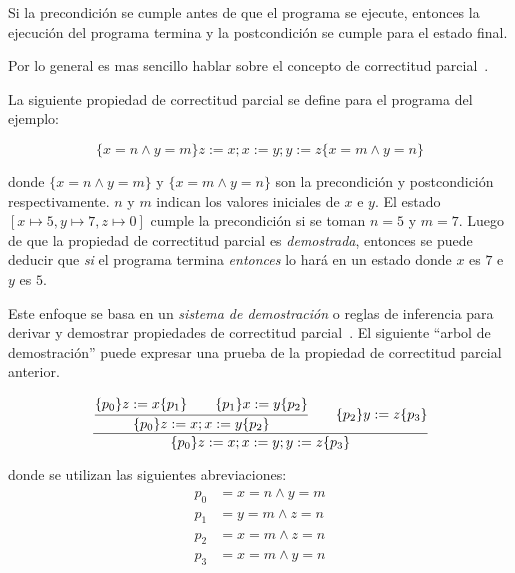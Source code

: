 \begin{displayquote}
Si la precondición se cumple antes de que el programa se ejecute, entonces la ejecución del programa termina y la postcondición se cumple para el estado final.
\end{displayquote}

Por lo general es mas sencillo hablar sobre el concepto de correctitud parcial~\citep{nipkow}.


La siguiente propiedad de correctitud parcial se define para el programa del ejemplo:

\begin{equation*}
\lbrace x=n \land y=m \rbrace z:=x; x:=y; y:=z \lbrace x=m \land y=n \rbrace
\end{equation*}

donde $\lbrace x=n \land y=m \rbrace $ y $\lbrace x=m \land y=n \rbrace $ son la precondición y postcondición respectivamente.
$n$ y $m$ indican los valores iniciales de $x$ e $y$.
El estado $[x\mapsto5, y\mapsto7, z\mapsto0]$ cumple la precondición si se toman $n=5$ y $m=7$.
Luego de que la propiedad de correctitud parcial es \textit{demostrada}, entonces se puede deducir que \textit{si} el programa termina \textit{entonces} lo hará en un estado donde $x$ es $7$ e $y$ es $5$.

Este enfoque se basa en un \textit{sistema de demostración} o reglas de inferencia para derivar y demostrar propiedades de correctitud parcial~\citep{nipkow}.
El siguiente ``arbol de demostración'' puede expresar una prueba de la propiedad de correctitud parcial anterior.
\begin{comment}
FIXME demostrar o probar
\end{comment}

\begin{equation*}
\cfrac{
  \cfrac{ \lbrace p_{0} \rbrace z:=x \lbrace p_{1} \rbrace \qquad \lbrace p_{1} \rbrace x:=y \lbrace p_{2} \rbrace }
    { \lbrace p_{0} \rbrace z:=x; x:=y \lbrace p_{2} \rbrace }
  \qquad
 \lbrace p_{2} \rbrace y:=z \lbrace p_{3} \rbrace
  }
  { \lbrace p_{0} \rbrace z:=x; x:=y; y:=z \lbrace p_{3} \rbrace }
\end{equation*}

donde se utilizan las siguientes abreviaciones:
\begin{align*}
p_{0} &= x=n \land y=m\\
p_{1} &= y=m \land z=n\\
p_{2} &= x=m \land z=n\\
p_{3} &= x=m \land y=n
\end{align*}

